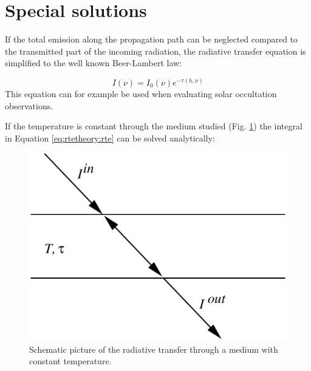 \section{Special solutions}
 \label{sec:rtetheory:special}
 
 If the total emission along the propagation path can be neglected
 compared to the transmitted part of the incoming radiation, the
 radiative transfer equation is simplified to the well known Beer-Lambert law:
 
 \begin{equation}
   I(\nu) = I_0(\nu)e^{-\tau(h,\nu)}
  \label{eq:rtetheory:beer}
 \end{equation}  
 This equation can for example be used when evaluating solar
 occultation observations.  
 
 If the temperature is constant through the medium studied (Fig.
 \ref{fig:rtetheory:layer}) the integral in Equation \ref{eq:rtetheory:rte} can
 be solved analytically:

 \begin{figure}
  \begin{center}
   \begin{minipage}[c]{0.4\textwidth}
    \centering
    \caption{Schematic picture of the radiative transfer through a medium with
             constant temperature.}
    \label{fig:rtetheory:layer}
   \end{minipage}%
   \hspace{0.05\textwidth}%
   \begin{minipage}[c]{0.50\textwidth}
    \centering
    \includegraphics*[width=0.99\hsize]{fig_layer}
   \end{minipage}
  \end{center}
 \end{figure}   
  
